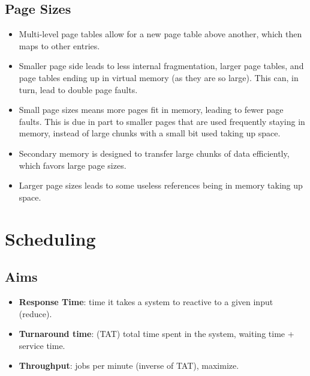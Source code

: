 \documentclass[fontsize=5pt]{scrartcl}
\begin{document}
\begin{multicols}{3}
      \subsection{Page Sizes}
      \begin{itemize}
       \item Multi-level page tables allow for a new page table above another, which then maps to other entries. 
       \item Smaller page side leads to less internal fragmentation, larger page tables, and page tables ending up in virtual memory (as they are so large). This can, in turn, lead to double page faults.
       \item Small page sizes means more pages fit in memory, leading to fewer page faults. This is due in part to smaller pages that are used frequently staying in memory, instead of large chunks with a small bit
             used taking up space.
       \item Secondary memory is designed to transfer large chunks of data efficiently, which favors large page sizes.
       \item Larger page sizes leads to some useless references being in memory taking up space.
      \end{itemize}
  \section{Scheduling}
    \subsection{Aims}
      \begin{itemize}
       \item \textbf{Response Time}: time it takes a system to reactive to a given input (reduce).
       \item \textbf{Turnaround time}: (TAT) total time spent in the system, waiting time + service time.
       \item \textbf{Throughput}: jobs per minute (inverse of TAT), maximize.
      \end{itemize}

\end{multicols}
\end{document}
